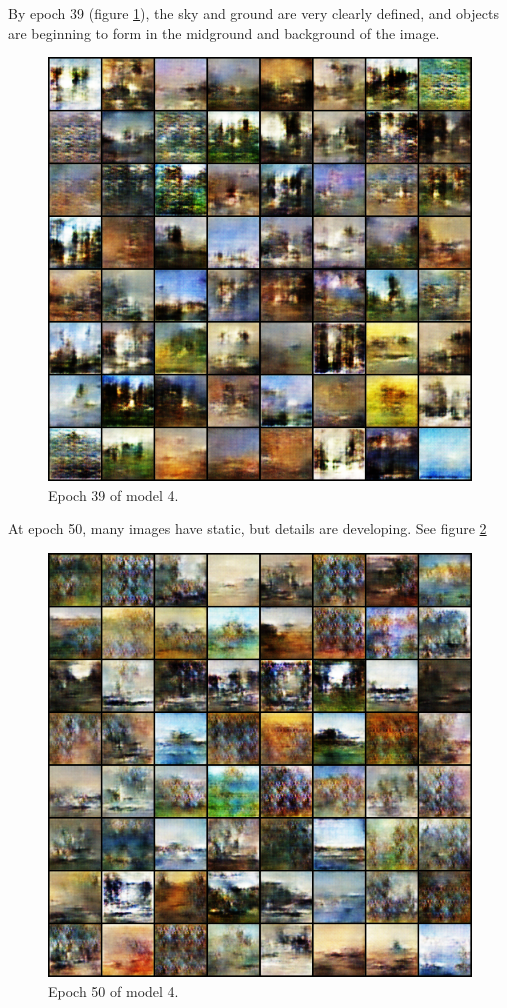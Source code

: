 \documentclass[11pt,letterpaper]{article}
\begin{document}
				By epoch 39 (figure \ref{fig:wa64:epoch039generator}), the sky and ground are very clearly defined, and objects are beginning to form in the midground and background of the image.
				\begin{figure}
					\centering
					\includegraphics[width=1.0\linewidth]{results/model4/epoch039_generator}
					\caption{Epoch 39 of model 4.}
					\label{fig:wa64:epoch039generator}
				\end{figure}

				At epoch 50, many images have static, but details are developing.
				See figure \ref{fig:wa64:epoch050generator}
				\begin{figure}
					\centering
					\includegraphics[width=1.0\linewidth]{results/model4/epoch050_generator}
					\caption{Epoch 50 of model 4.}
					\label{fig:wa64:epoch050generator}
				\end{figure}
\end{document}
